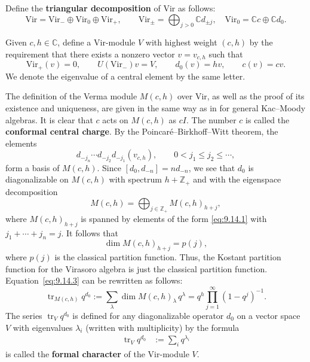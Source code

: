 \documentclass[12pt]{article}
\begin{document}
Define the \textbf{triangular decomposition} of $\mathrm{Vir}$ as follows:
\[
    \mathrm{Vir} = \mathrm{Vir}_- \oplus \mathrm{Vir}_0 \oplus \mathrm{Vir}_+,
    \qquad
    \mathrm{Vir}_\pm = \bigoplus_{j>0} \mathbb{C} d_{\pm j}, \quad
    \mathrm{Vir}_0 = \mathbb{C} c \oplus \mathbb{C} d_0.
\]

Given $c,h \in \mathbb{C}$, define a $\mathrm{Vir}$-module $V$ with highest
weight $(c,h)$ by the requirement that there exists a nonzero vector
$v = v_{c,h}$ such that
\[
    \mathrm{Vir}_+(v) = 0, \qquad U(\mathrm{Vir}_-)v = V, \qquad
    d_0(v) = h v, \qquad c(v) = c v.
\]
We denote the eigenvalue of a central element by the same letter.

The definition of the Verma module $M(c,h)$ over $\mathrm{Vir}$,
as well as the proof of its existence and uniqueness, are given in
the same way as in for general Kac--Moody algebras. It is clear that $c$ acts on $M(c,h)$ as $cI$. The number $c$ is called the \textbf{conformal central charge}.
By the Poincaré–Birkhoff–Witt theorem, the elements
\begin{equation}\label{eq:9.14.1}
    d_{-j_n}\cdots d_{-j_2} d_{-j_1}(v_{c,h}),
    \qquad 0 < j_1 \le j_2 \le \cdots,
\end{equation}
form a basis of $M(c,h)$. Since $[d_0,d_{-n}] = n d_{-n}$, we see
that $d_0$ is diagonalizable on $M(c,h)$ with spectrum
$h + \mathbb{Z}_+$ and with the eigenspace decomposition
\begin{equation}\label{eq:9.14.2}
    M(c,h) = \bigoplus_{j \in \mathbb{Z}_+} M(c,h)_{h+j},
\end{equation}
where $M(c,h)_{h+j}$ is spanned by elements of the form
\eqref{eq:9.14.1} with $j_1 + \cdots + j_n = j$.
It follows that
\begin{equation}\label{eq:9.14.3}
    \dim M(c,h)_{h+j} = p(j),
\end{equation}
where $p(j)$ is the classical partition function. Thus, the Kostant
partition function for the Virasoro algebra is just the classical
partition function.
Equation~\eqref{eq:9.14.3} can be rewritten as follows:
\[
    \operatorname{tr}_{M(c,h)} q^{d_0}
    := \sum_\lambda \dim M(c,h)_\lambda\, q^\lambda
    = q^h \prod_{j=1}^\infty (1 - q^j)^{-1}.
\]
The series $\operatorname{tr}_V q^{d_0}$ is defined for any diagonalizable operator $d_0$ on a vector space $V$ with eigenvalues $\lambda_i$ (written with multiplicity) by the formula
\begin{align*}
    \operatorname{tr}_V q^{d_0}
     & := \sum_i q^{\lambda_i}
\end{align*}
is called the
\textbf{formal character} of the $\mathrm{Vir}$-module $V$.
\end{document}
